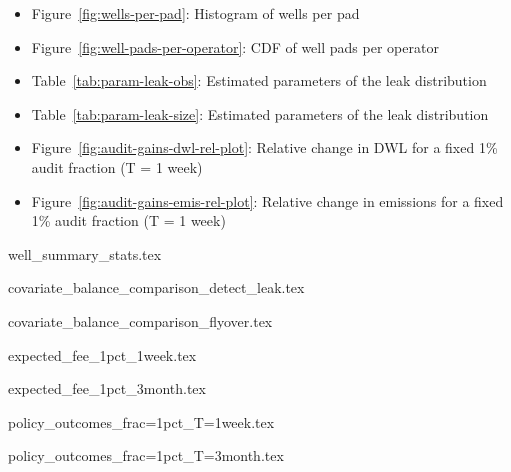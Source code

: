 \documentclass[12pt,oneside,letterpaper]{article}
\begin{document}
\begin{itemize}
\item Figure~\ref{fig:wells-per-pad}: Histogram of wells per pad
\item Figure~\ref{fig:well-pads-per-operator}: CDF of well pads per operator
\item Table~\ref{tab:param-leak-obs}: Estimated parameters of the leak distribution
\item Table~\ref{tab:param-leak-size}: Estimated parameters of the leak distribution
\item Figure~\ref{fig:audit-gains-dwl-rel-plot}: Relative change in DWL for a fixed 1\% audit fraction (T = 1 week)
\item Figure~\ref{fig:audit-gains-emis-rel-plot}: Relative change in emissions for a fixed 1\% audit fraction (T = 1 week)
\end{itemize}


\begin{table}[H]
{well_summary_stats.tex}
\end{table}

\begin{table}[H]
{covariate_balance_comparison_detect_leak.tex}
\end{table}

\begin{table}[H]
{covariate_balance_comparison_flyover.tex}
\end{table}

\begin{table}[H]
{expected_fee_1pct_1week.tex}
\end{table}

\begin{table}[H]
{expected_fee_1pct_3month.tex}
\end{table}

%

\begin{table}[H]
{policy_outcomes_frac=1pct_T=1week.tex}
\end{table}

\begin{table}[H]
{policy_outcomes_frac=1pct_T=3month.tex}
\end{table}
\end{document}
